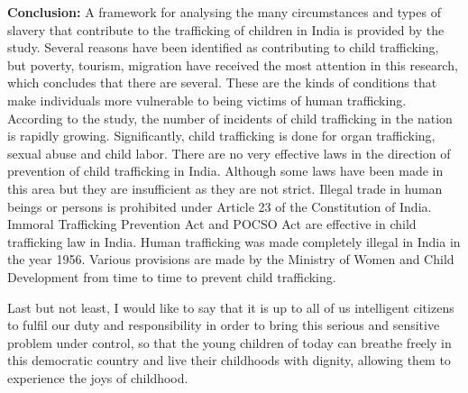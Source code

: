 \begin{multicols}{2}
\noi
\textbf{Conclusion:} A framework for analysing the many circumstances and types of slavery
that contribute to the trafficking of children in India is provided by the study. Several
reasons have been identified as contributing to child trafficking, but poverty, tourism,
migration have received the most attention in this research, which concludes that there 
are several. These are the kinds of conditions that make individuals more vulnerable to
being victims of human trafficking. According to the study, the number of incidents of
child trafficking in the nation is rapidly growing. Significantly, child trafficking is done
for organ trafficking, sexual abuse and child labor. There are no very effective laws in
the direction of prevention of child trafficking in India. Although some laws have been
made in this area but they are insufficient as they are not strict. Illegal trade in human
beings or persons is prohibited under Article 23 of the Constitution of India. Immoral
Trafficking Prevention Act and POCSO Act are effective in child trafficking law in
India. Human trafficking was made completely illegal in India in the year 1956. Various
provisions are made by the Ministry of Women and Child Development from time to
time to prevent child trafficking.

\noi
Last but not least, I would like to say that it is up to all of us intelligent citizens to fulfil
our duty and responsibility in order to bring this serious and sensitive problem under
control, so that the young children of today can breathe freely in this democratic country
and live their childhoods with dignity, allowing them to experience the joys of
childhood.


\end{multicols}
\label{end2016-art5}
